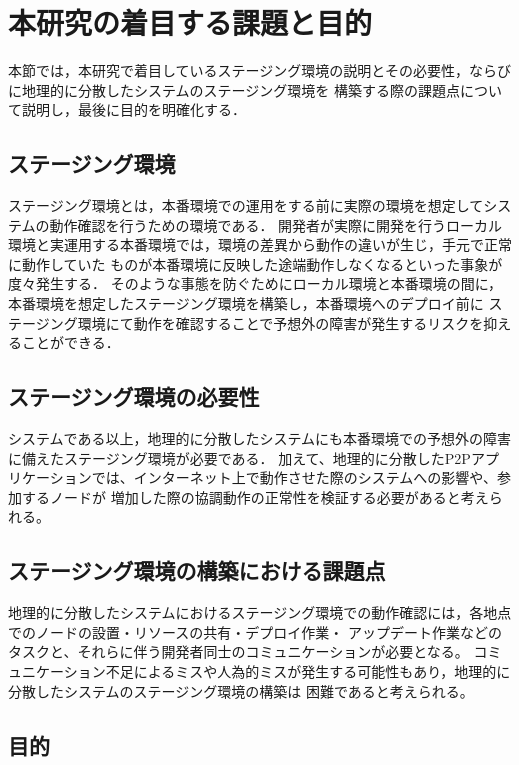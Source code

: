 \section{本研究の着目する課題と目的}
\label{introduction:issue-and-aim}

本節では，本研究で着目しているステージング環境の説明とその必要性，ならびに地理的に分散したシステムのステージング環境を
構築する際の課題点について説明し，最後に目的を明確化する．

\subsection{ステージング環境}

ステージング環境とは，本番環境での運用をする前に実際の環境を想定してシステムの動作確認を行うための環境である．
開発者が実際に開発を行うローカル環境と実運用する本番環境では，環境の差異から動作の違いが生じ，手元で正常に動作していた
ものが本番環境に反映した途端動作しなくなるといった事象が度々発生する．
そのような事態を防ぐためにローカル環境と本番環境の間に，本番環境を想定したステージング環境を構築し，本番環境へのデプロイ前に
ステージング環境にて動作を確認することで予想外の障害が発生するリスクを抑えることができる．

\subsection{ステージング環境の必要性}

システムである以上，地理的に分散したシステムにも本番環境での予想外の障害に備えたステージング環境が必要である．
加えて、地理的に分散したP2Pアプリケーションでは、インターネット上で動作させた際のシステムへの影響や、参加するノードが
増加した際の協調動作の正常性を検証する必要があると考えられる。

\subsection{ステージング環境の構築における課題点}
\label{introduction:issue-and-aim:issue}

地理的に分散したシステムにおけるステージング環境での動作確認には，各地点でのノードの設置・リソースの共有・デプロイ作業・
アップデート作業などのタスクと、それらに伴う開発者同士のコミュニケーションが必要となる。
コミュニケーション不足によるミスや人為的ミスが発生する可能性もあり，地理的に分散したシステムのステージング環境の構築は
困難であると考えられる。

\subsection{目的}
\label{introduction:issue-and-aim:aim}

